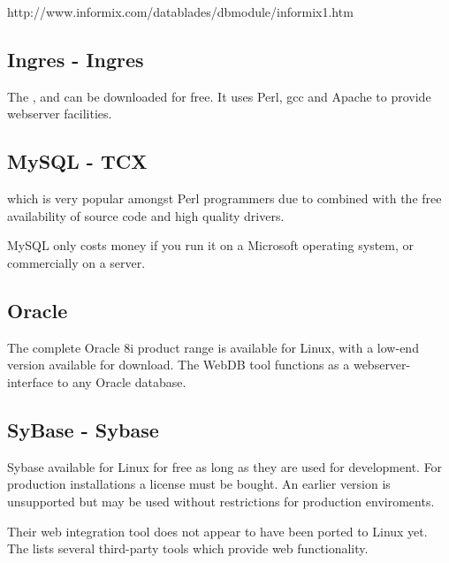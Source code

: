 http://www.informix.com/datablades/dbmodule/informix1.htm

 
\subsection{Ingres - Ingres}
\label{sec:ingres}

The
, and can be downloaded for
free.  It uses Perl, gcc and Apache to provide webserver facilities.



\subsection{MySQL - TCX}
\label{sec:mysql}

 which is
very popular amongst Perl programmers due to
combined with the free availability of source code and high quality
drivers.

MySQL only costs money if you run it on a Microsoft operating system,
or commercially on a server.

\subsection{Oracle}
\label{sec:oracle}

The complete Oracle 8i product range is available for Linux, with a
low-end version available for download.  The WebDB tool functions as a
webserver-interface to any Oracle database.

\subsection{SyBase - Sybase}

Sybase  available for
  Linux for free as long as they are used for development.  For
  production installations a license must be bought.  An earlier
  version is unsupported but may be used without restrictions for
  production enviroments.
  
  Their web integration tool does not appear to have been ported to
  Linux yet.  The  lists several third-party tools which provide web
  functionality.

  
  


